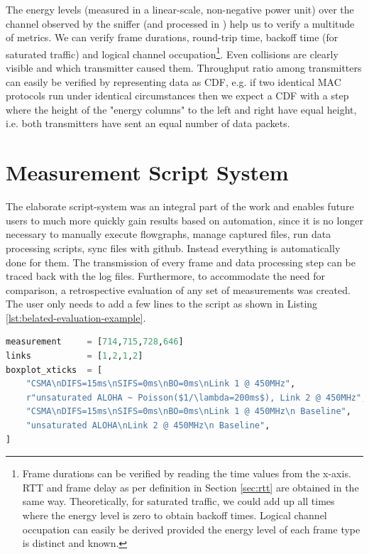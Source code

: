 The energy levels (measured in a linear-scale, non-negative power unit) over the channel observed by the sniffer (and processed in ) help us to verify a multitude of metrics. We can verify frame durations, round-trip time, backoff time (for saturated traffic) and logical channel occupation\footnote{Frame durations can be verified by reading the time values from the x-axis. RTT and frame delay as per definition in Section \ref{sec:rtt} are obtained in the same way. Theoretically, for saturated traffic, we could add up all times where the energy level is zero to obtain backoff times. Logical channel occupation can easily be derived provided the energy level of each frame type is distinct and known.}. Even collisions are clearly visible and which transmitter caused them. Throughput ratio among transmitters can easily be verified by representing data as CDF, e.g. if two identical MAC protocols run under identical circumstances then we expect a CDF with a step where the height of the "energy columns" to the left and right have equal height, i.e. both transmitters have sent an equal number of data packets.

\section{Measurement Script System}
\label{sec:script-system}

The elaborate script-system was an integral part of the work and enables future users to much more quickly gain results based on automation, since it is no longer necessary to manually execute flowgraphs, manage captured files, run data processing scripts, sync files with github. Instead everything is automatically done for them. The transmission of every frame and data processing step can be traced back with the log files. Furthermore, to accommodate the need for comparison, a retrospective evaluation of any set of measurements  was created. The user only needs to add a few lines to the script as shown in Listing \ref{lst:belated-evaluation-example}.
  
\begin{lstlisting}[language=Python,caption=Evaluation of measurements with \code{belated\_evaluation.py}. In \code{links} we denote the link we used in the corresponding measurement (compare Figure \ref{fig:measurement-setup}).,label=lst:belated-evaluation-example]
measurement     = [714,715,728,646]
links           = [1,2,1,2]
boxplot_xticks  = [
	"CSMA\nDIFS=15ms\nSIFS=0ms\nBO=0ms\nLink 1 @ 450MHz",
    r"unsaturated ALOHA ~ Poisson($1/\lambda=200ms$), Link 2 @ 450MHz",
    "CSMA\nDIFS=15ms\nSIFS=0ms\nBO=0ms\nLink 1 @ 450MHz\n Baseline",
    "unsaturated ALOHA\nLink 2 @ 450MHz\n Baseline",
]
\end{lstlisting}

